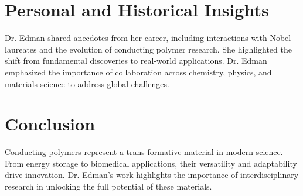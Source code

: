 \documentclass[12pt]{article}
\begin{document}
\section{Personal and Historical Insights}
Dr. Edman shared anecdotes from her career, including interactions with Nobel laureates and the evolution of conducting polymer research. She highlighted the shift from fundamental discoveries to real-world applications. Dr. Edman emphasized the importance of collaboration across chemistry, physics, and materials science to address global challenges.

\section{Conclusion}
Conducting polymers represent a trans-formative material in modern science. From energy storage to biomedical applications, their versatility and adaptability drive innovation. Dr. Edman’s work highlights the importance of interdisciplinary research in unlocking the full potential of these materials.
\end{document}
